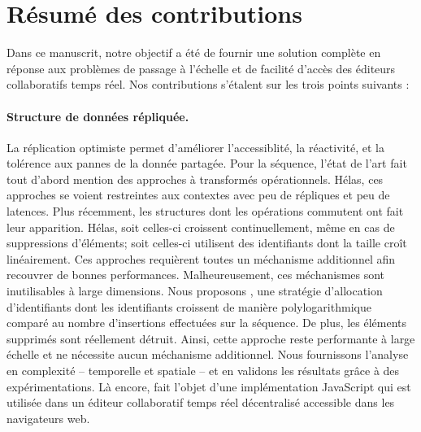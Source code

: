 
\section{Résumé des contributions}
\label{conclu:sec:summary}

Dans ce manuscrit, notre objectif a été de fournir une solution complète en
réponse aux problèmes de passage à l'échelle et de facilité d'accès des éditeurs
collaboratifs temps réel. Nos contributions s'étalent sur les trois points
suivants :

\paragraph{Structure de données répliquée.} La réplication optimiste permet
d'améliorer l'accessiblité, la réactivité, et la tolérence aux pannes de la
donnée partagée. Pour la séquence, l'état de l'art fait tout d'abord mention des
approches à transformés opérationnels. Hélas, ces approches se voient
restreintes aux contextes avec peu de répliques et peu de latences. Plus
récemment, les structures dont les opérations commutent ont fait leur
apparition. Hélas, soit celles-ci croissent continuellement, même en cas de
suppressions d'éléments; soit celles-ci utilisent des identifiants dont la
taille croît linéairement. Ces approches requièrent toutes un méchanisme
additionnel afin recouvrer de bonnes performances. Malheureusement, ces
méchanismes sont inutilisables à large dimensions. Nous proposons \LSEQ, une
stratégie d'allocation d'identifiants dont les identifiants croissent de manière
polylogarithmique comparé au nombre d'insertions effectuées sur la séquence. De
plus, les éléments supprimés sont réellement détruit. Ainsi, cette approche
reste performante à large échelle et ne nécessite aucun méchanisme additionnel.
Nous fournissons l'analyse en complexité -- temporelle et spatiale -- et en
validons les résultats grâce à des expérimentations. Là encore, \LSEQ fait
l'objet d'une implémentation JavaScript qui est utilisée dans un éditeur
collaboratif temps réel décentralisé accessible dans les navigateurs web.

